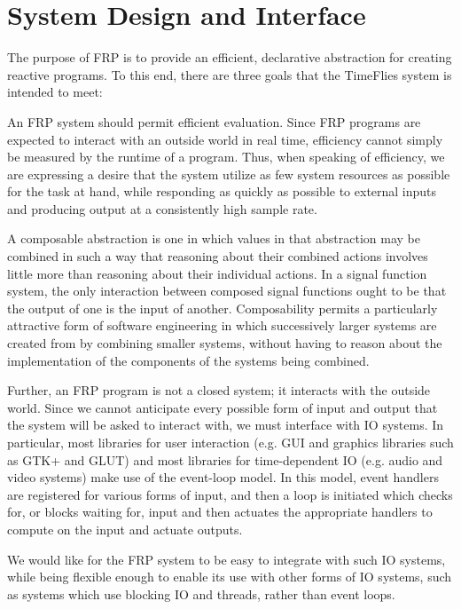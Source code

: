 \section{System Design and Interface}
\label{section:System_Design_and_Interface}

The purpose of FRP is to provide an efficient, declarative abstraction for creating
reactive programs. To this end, there are three goals that the TimeFlies
system is intended to meet:

An FRP system should permit efficient evaluation. Since FRP programs are
expected to  interact with an outside world in real time, efficiency cannot
simply be measured by the runtime of a program. Thus, when speaking of
efficiency, we are expressing a desire that the system utilize as few system
resources as possible for the task at hand, while responding as quickly as
possible to external inputs and producing output at a consistently high sample
rate.

A composable abstraction is one in which values in that abstraction may be
combined in such a way that reasoning about their combined actions involves
little more than reasoning about their individual actions. In a signal function
system, the only interaction between composed signal functions ought to be that
the output of one is the input of another. Composability permits a particularly
attractive form of software engineering in which successively larger systems are
created from by combining smaller systems, without having to reason about the 
implementation of the components of the systems being combined.

Further, an FRP program is not a closed system; it interacts with the outside
world. Since we cannot anticipate every possible form of input and output that
the system will be asked to interact with, we must interface with IO systems.
In particular, most libraries for user interaction (e.g. GUI and graphics
libraries such as GTK+ and GLUT) and most libraries for time-dependent IO
(e.g. audio and video systems) make use of the event-loop model. In this
model, event handlers are registered for various forms of input, and then a
loop is initiated which checks for, or blocks waiting for, input and then
actuates the appropriate handlers to compute on the input and actuate outputs.

We would like for the FRP system to be easy to integrate with such IO systems,
while being flexible enough to enable its use with other forms of IO systems,
such as systems which use blocking IO and threads, rather than event loops.

